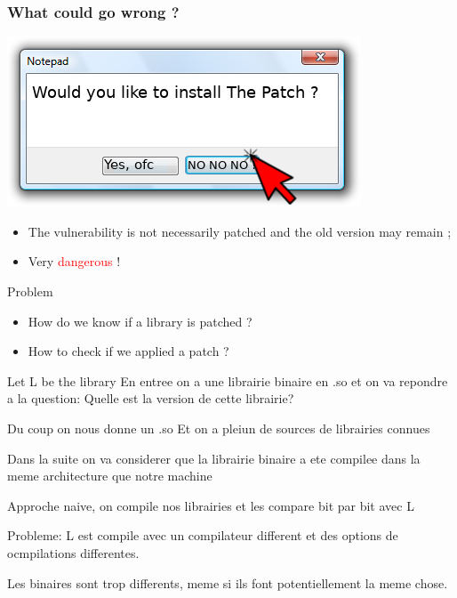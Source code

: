 \documentclass[11pt]{beamer}
\begin{document}
\begin{frame}
    \frametitle{What could go wrong ?}
    \begin{center}
    \includegraphics[scale=0.5]{box.png}
    \end{center}

    \begin{block}{}
    \begin{itemize}
        \item The vulnerability is not necessarily patched and the old version may remain ;
        \item \Huge Very \textcolor{red}{dangerous} !
    \end{itemize}
    \end{block}

    \end{frame}
\begin{frame}
    \begin{block}{Problem}
        \begin{itemize}
            \item How do we know if a library is patched ?  
            \item How to check if we applied a patch ?
        \end{itemize}
    \end{block}
   

    Let L be the library
        En entree on a une librairie binaire en .so et on va repondre a la
        question: Quelle est la version de cette librairie?

        Du coup on nous donne un .so 
        Et on a pleiun de sources de librairies connues

        Dans la suite on va considerer que la librairie binaire a ete compilee
        dans la meme architecture que notre machine 
\end{frame}


\begin{frame}

    Approche naive, on compile nos librairies et les compare bit par bit avec
    L

    Probleme: L est compile avec un compilateur different et des options de
    ocmpilations differentes.

    Les binaires sont trop differents, meme si ils font potentiellement la
    meme chose.

\end{frame}
\end{document}
